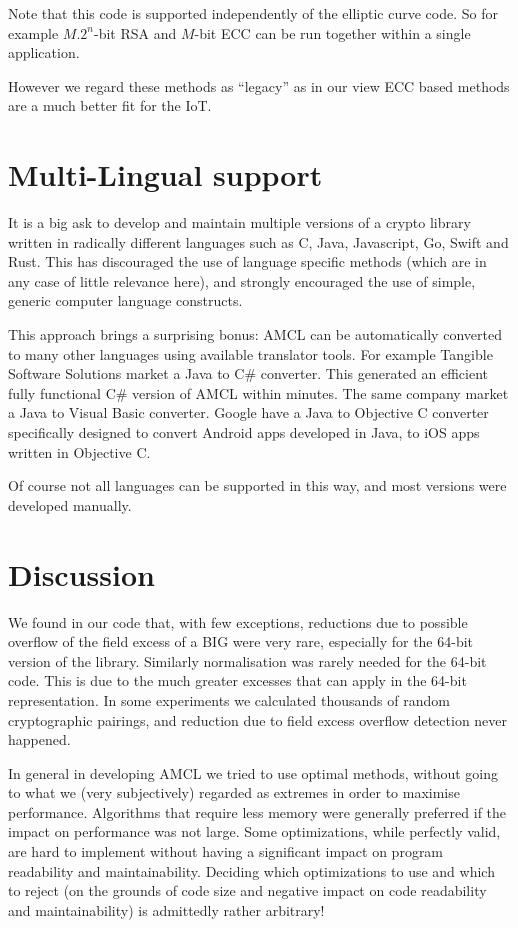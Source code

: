 \documentclass{llncs}
\begin{document}
Note that this code is supported independently of the elliptic curve code. So for example $M.2^n$-bit RSA and $M$-bit ECC can be run together within a single application. 

However we regard these methods as ``legacy'' as in our view ECC based methods are a much better fit for the IoT. 

\section{Multi-Lingual support}

It is a big ask to develop and maintain multiple versions of a crypto library written in radically different languages such as C, Java, Javascript, Go, Swift and Rust. This has discouraged the use of
language specific methods (which are in any case of little relevance here), and strongly encouraged the use of simple, generic computer language constructs. 

This approach brings a surprising bonus: AMCL can be automatically converted to many other languages using available translator tools. For example Tangible Software Solutions \cite{tss}
market a Java to C\# converter. This generated an efficient fully functional C\# version of AMCL within minutes. The same company market a Java to Visual Basic converter. 
Google have a Java to Objective C
converter \cite{gol} specifically designed to convert Android apps developed in Java, to iOS apps written in Objective C.

Of course not all languages can be supported in this way, and most versions were developed manually. 


\section{Discussion}

We found in our code that, with few exceptions, reductions due to possible overflow of the field excess of a BIG were very rare, especially for the 64-bit version of the library. Similarly 
normalisation was 
rarely needed for the 64-bit code. This is due to the much greater excesses that can apply in the 64-bit representation. In some experiments we calculated thousands of random cryptographic pairings, 
and reduction due to field excess overflow detection never happened.

In general in developing AMCL we tried to use optimal methods, without going to what we (very subjectively) regarded as extremes in order to maximise performance. 
Algorithms that require less memory were generally preferred if the impact on performance was not large. Some optimizations, while perfectly valid, are hard to 
implement without having a significant impact on program readability and maintainability. Deciding which optimizations to use and which to reject (on the grounds of code size and negative impact on code 
readability and maintainability) is admittedly rather arbitrary!
\end{document}
